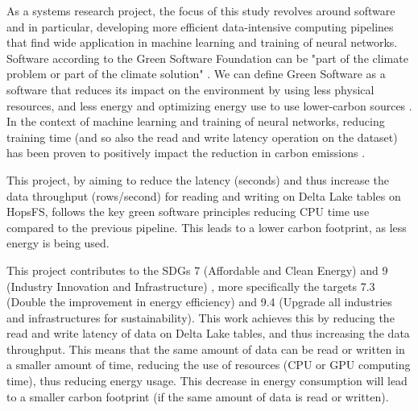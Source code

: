 As a systems research project, the focus of this study revolves around software and in particular, developing more efficient data-intensive computing pipelines that find wide application in machine learning and training of neural networks. Software according to the Green Software Foundation \cite{GreenSoftwareFoundation} can be "part of the climate problem or part of the climate solution" \cite{WhatGreenSoftware2021}. We can define Green Software as a software that reduces its impact on the environment by using less physical resources, and less energy and optimizing energy use to use lower-carbon sources \cite{WhatGreenSoftware2021}. In the context of machine learning and training of neural networks, reducing training time (and so also the read and write latency operation on the dataset) has been proven to positively impact the reduction in carbon emissions \cite{pattersonCarbonEmissionsLarge2021,pattersonCarbonFootprintMachine2022}.

This project, by aiming to reduce the latency (seconds) and thus increase the data throughput (rows/second) for reading and writing on Delta Lake tables on \gls{HopsFS}, follows the key green software principles reducing \gls{CPU} time use compared to the previous pipeline. This leads to a lower carbon footprint, as less energy is being used.

This project contributes to the \glspl{SDG} 7 (Affordable and Clean Energy) and 9 (Industry Innovation and Infrastructure) \cite{SustainableDevelopment}, more specifically the targets 7.3 (Double the improvement in energy efficiency) and 9.4 (Upgrade all industries and infrastructures for sustainability). This work achieves this by reducing the read and write latency of data on Delta Lake tables, and thus increasing the data throughput. This means that the same amount of data can be read or written in a smaller amount of time, reducing the use of resources (\gls{CPU} or \gls{GPU} computing time), thus reducing energy usage. This decrease in energy consumption will lead to a smaller carbon footprint (if the same amount of data is read or written). 

